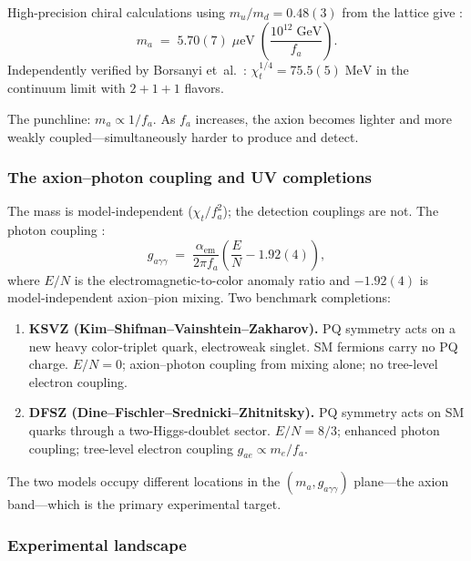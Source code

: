 High-precision chiral calculations using $m_u/m_d = 0.48(3)$ from the lattice give \cite{1511.02867}:
\begin{equation}\label{eq:axion-mass-numerical}
  m_a \;=\; 5.70(7)\;\mu\mathrm{eV}\;\left(\frac{10^{12}\;\mathrm{GeV}}{f_a}\right).
\end{equation}
Independently verified by Borsanyi et~al.\ \cite{1606.07494}: $\chi_t^{1/4} = 75.5(5)\;\mathrm{MeV}$ in the continuum limit with $2+1+1$ flavors.

The punchline: $m_a\propto 1/f_a$.  As $f_a$ increases, the axion becomes lighter and more weakly coupled---simultaneously harder to produce and detect.

\subsubsection{The axion--photon coupling and UV completions}

The mass is model-independent ($\chi_t/f_a^2$); the detection couplings are not.  The photon coupling \cite{Hook2018TASIStrongCPAxions}:
\begin{equation}\label{eq:axion-photon}
  g_{a\gamma\gamma} \;=\; \frac{\alpha_{\mathrm{em}}}{2\pi f_a}\left(\frac{E}{N} - 1.92(4)\right),
\end{equation}
where $E/N$ is the electromagnetic-to-color anomaly ratio and $-1.92(4)$ is model-independent axion--pion mixing.  Two benchmark completions:

\begin{enumerate}
  \item \textbf{KSVZ (Kim--Shifman--Vainshtein--Zakharov).} PQ symmetry acts on a new heavy color-triplet quark, electroweak singlet.  SM fermions carry no PQ charge.  $E/N = 0$; axion--photon coupling from mixing alone; no tree-level electron coupling.

  \item \textbf{DFSZ (Dine--Fischler--Srednicki--Zhitnitsky).} PQ symmetry acts on SM quarks through a two-Higgs-doublet sector.  $E/N = 8/3$; enhanced photon coupling; tree-level electron coupling $g_{ae}\propto m_e/f_a$.
\end{enumerate}

\noindent The two models occupy different locations in the $(m_a, g_{a\gamma\gamma})$ plane---the axion band---which is the primary experimental target.

\subsubsection{Experimental landscape}

